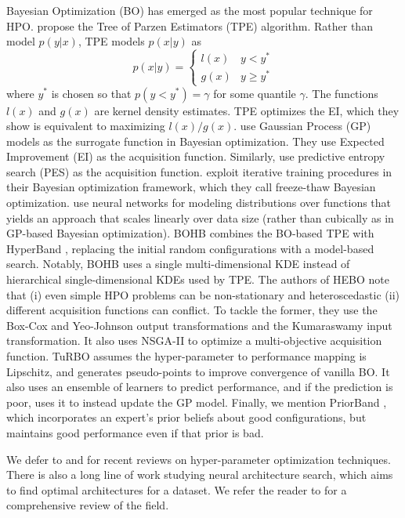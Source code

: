 Bayesian Optimization (BO) has emerged as the most popular technique for HPO. \citet{bergstra2011algorithms} propose the Tree of Parzen Estimators (TPE) algorithm. Rather than model $p(y|x)$, TPE models $p(x|y)$ as 
$$
p(x|y) = \begin{cases}
    l(x) &  y < y^* \\
    g(x) &  y \geq y^*
    \end{cases}
$$
where $y^*$ is chosen so that $p(y < y^*) = \gamma$ for some quantile $\gamma$. The functions $l(x)$ and $g(x)$ are kernel density estimates. TPE optimizes the EI, which they show is equivalent to maximizing $l(x) / g(x)$.
\citet{snoek2012practical} use Gaussian Process (GP) models as the surrogate function in Bayesian optimization. They use Expected Improvement (EI) as the acquisition function. Similarly, \citet{hernandez2014predictive} use predictive entropy search (PES) as the acquisition function. \citet{swersky2014freeze} exploit iterative training procedures in their Bayesian optimization framework, which they call freeze-thaw Bayesian optimization. \citet{snoek2015scalable} use neural networks for modeling distributions over functions that yields an approach that scales linearly over data size (rather than cubically as in GP-based Bayesian optimization). BOHB \cite{falkner2018bohb} combines the BO-based TPE with HyperBand \cite{li2017hyperband}, replacing the initial random configurations with a model-based search. Notably, BOHB uses a single multi-dimensional KDE instead of hierarchical single-dimensional KDEs used by TPE. The authors of HEBO \cite{cowen2022hebo} note that (i) even simple HPO problems can be non-stationary and heteroscedastic (ii) different acquisition functions can conflict. To tackle the former, they use the Box-Cox \cite{box1964analysis} and Yeo-Johnson \cite{yeo2000new} output transformations and the Kumaraswamy \cite{kumaraswamy1980generalized} input transformation. It also uses NSGA-II to optimize a multi-objective acquisition function. TuRBO \cite{dou2023turbo} assumes the hyper-parameter to performance mapping is Lipschitz, and generates pseudo-points to improve convergence of vanilla BO. It also uses an ensemble of learners to predict performance, and if the prediction is poor, uses it to instead update the GP model. Finally, we mention PriorBand \cite{mallik2023priorband}, which incorporates an expert's prior beliefs about good configurations, but maintains good performance even if that prior is bad.

We defer to \cite{feurer2019hyperparameter} and \cite{bischl2023hyperparameter} for recent reviews on hyper-parameter optimization techniques. There is also a long line of work studying neural architecture search, which aims to find optimal architectures for a dataset. We refer the reader to \citet{white2023neural} for a comprehensive review of the field.

